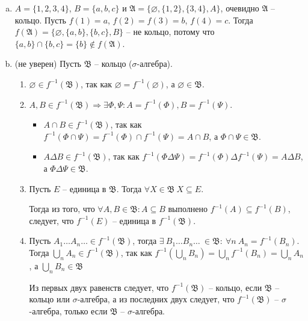 \begin{solution}
\begin{enumerate}[(a)]
    \item $A = \{1, 2, 3, 4\}$, $B = \{a, b, c\}$  и $\mathfrak{A} = \{\varnothing, \{1, 2\}, \{3, 4\}, A\}$, очевидно $\mathfrak{A}$ -- кольцо. Пусть $f(1) = a$, $f(2) = f(3) = b$, $f(4) = c$. Тогда $f(\mathfrak{A}) = \{\varnothing, \{a, b\}, \{b, c\}, B\}$ -- не кольцо, потому что $\{a, b\} \cap \{b, c\} = \{b\} \notin f(\mathfrak{A})$.
    
    \item (не уверен) Пусть $\mathfrak{B}$ -- кольцо ($\sigma$-алгебра).
    \begin{enumerate}[1)]
        \item $\varnothing \in f^{-1}(\mathfrak{B})$, так как $\varnothing = f^{-1}(\varnothing)$, а $\varnothing \in \mathfrak{B}$.
        
         \item
        $A, B \in  f^{-1}(\mathfrak{B}) \Rightarrow \exists \Phi,\Psi :  A = f^{-1}(\Phi), B = f^{-1}(\Psi)$.
        \begin{itemize}
            \item $A \cap B \in  f^{-1} ( \mathfrak{B} )$, так как $f^{-1} ( \Phi \cap \Psi ) = f^{-1} ( \Phi ) \cap f^{-1} ( \Psi ) = A \cap B$, а $\Phi \cap \Psi \in \mathfrak{B}$.
            \item $A \Delta B \in  f^{-1} ( \mathfrak{B} )$, так как $f^{-1} ( \Phi \Delta \Psi ) = f^{-1} ( \Phi ) \Delta f^{-1} ( \Psi ) = A \Delta B$, а $\Phi \Delta \Psi \in \mathfrak{B}$.
        \end{itemize}
        
        \item
        Пусть $E$ -- единица в $\mathfrak{B}$. Тогда $\forall X \in \mathfrak{B} ~ X \subseteq E$. 
        
        Тогда из того, что $\forall A, B \in \mathfrak{B} : A \subseteq B$ выполнено $f^{-1}(A) \subseteq f^{-1} (B)$, следует, что $f^{-1} (E)$ -- единица в $f^{-1} ( \mathfrak{B} )$.
        
        \item
        Пусть $A_1 \ldots A_n \ldots \in f^{-1} ( \mathfrak{B} )$, тогда $\exists ~ B_1 \ldots B_n \ldots ~ \in \mathfrak{B} : ~ \forall n ~ A_n = f^{-1} (B_n)$. Тогда $\underset{n}{\bigcup}A_n \in f^{-1} ( \mathfrak{B} )$, так как $f^{-1} ( \underset{n}{\bigcup} B_n ) = \underset{n}{\bigcup} f^{-1} (B_n) = \underset{n}{\bigcup} A_n$, а $\underset{n}{\bigcup} B_n \in \mathfrak{B}$
        
        Из первых двух равенств следует, что $f^{-1} ( \mathfrak{B} )$ -- кольцо, если $\mathfrak{B}$ -- кольцо или $\sigma$-алгебра, а из последних двух следует, что $f^{-1}(\mathfrak{B})$ -- $\sigma$-алгебра, только если $\mathfrak{B}$ -- $\sigma$-алгебра.
    \end{enumerate}
\end{enumerate}
\end{solution}
